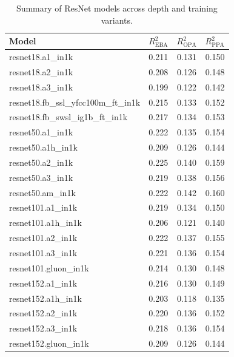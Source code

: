 \documentclass{article}
\theoremstyle{plain}
\theoremstyle{definition}
\theoremstyle{remark}
\begin{document}
\begin{table}[!t]
\caption{Summary of ResNet models across depth and training variants.}
\label{tab:resnetsummary}
\centering
\small
\setlength{\tabcolsep}{5pt}
\renewcommand{\arraystretch}{1.15}
\begin{tabular}{lccc}
\toprule
Model & $R^2_{\text{EBA}}$ & $R^2_{\text{OPA}}$ & $R^2_{\text{PPA}}$ \\
\midrule
resnet18.a1\_in1k                  & 0.211 & 0.131 & 0.150 \\
resnet18.a2\_in1k                  & 0.208 & 0.126 & 0.148 \\
resnet18.a3\_in1k                  & 0.199 & 0.122 & 0.142 \\
resnet18.fb\_ssl\_yfcc100m\_ft\_in1k & 0.215 & 0.133 & 0.152 \\
resnet18.fb\_swsl\_ig1b\_ft\_in1k    & 0.217 & 0.134 & 0.153 \\

resnet50.a1\_in1k                  & 0.222 & 0.135 & 0.154 \\
resnet50.a1h\_in1k                 & 0.209 & 0.126 & 0.144 \\
resnet50.a2\_in1k                  & 0.225 & 0.140 & 0.159 \\
resnet50.a3\_in1k                  & 0.219 & 0.138 & 0.156 \\
resnet50.am\_in1k                  & 0.222 & 0.142 & 0.160 \\

resnet101.a1\_in1k                 & 0.219 & 0.134 & 0.150 \\
resnet101.a1h\_in1k                & 0.206 & 0.121 & 0.140 \\
resnet101.a2\_in1k                 & 0.222 & 0.137 & 0.155 \\
resnet101.a3\_in1k                 & 0.221 & 0.136 & 0.154 \\
resnet101.gluon\_in1k              & 0.214 & 0.130 & 0.148 \\

resnet152.a1\_in1k                 & 0.216 & 0.130 & 0.149 \\
resnet152.a1h\_in1k                & 0.203 & 0.118 & 0.135 \\
resnet152.a2\_in1k                 & 0.220 & 0.136 & 0.152 \\
resnet152.a3\_in1k                 & 0.218 & 0.136 & 0.154 \\
resnet152.gluon\_in1k              & 0.209 & 0.126 & 0.144 \\
\bottomrule
\end{tabular}
\end{table}
\end{document}
